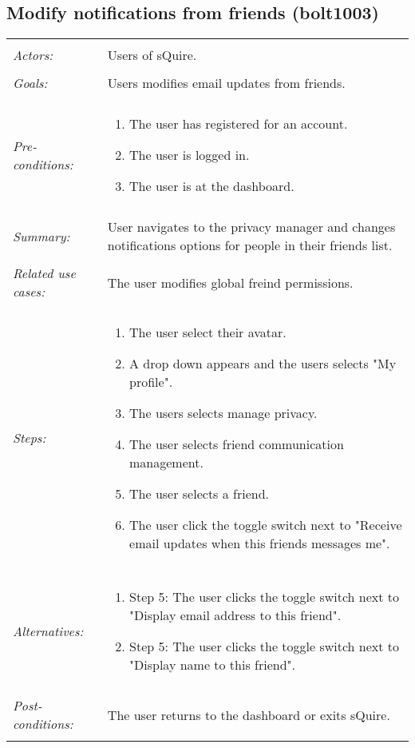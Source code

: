 \documentclass[11pt]{report}
\begin{document}
\subsection{Modify notifications from friends (bolt1003)}
\begin{tabular}{ p{2cm} p{12cm} }
 \hline
 \\
 \textit{Actors:} & Users of sQuire. \\ 
 \\
 \textit{Goals:} & Users modifies email updates from friends. \\
 \\
 \textit{Pre-conditions:} & \begin{enumerate}
  \item The user has registered for an account.
  \item The user is logged in.
  \item The user is at the dashboard.
 \end{enumerate} \\
 \\
 \textit{Summary:} & User navigates to the privacy manager and changes notifications options for people in their friends list.\\ 
 \\
 \textit{Related use cases:} & The user modifies global freind permissions. \\ 
 \\
 \textit{Steps:} & \begin{enumerate}
  \item The user select their avatar.
  \item A drop down appears and the users selects "My profile".
  \item The users selects manage privacy.
  \item The user selects friend communication management.
  \item The user selects a friend.
  \item The user click the toggle switch next to "Receive email updates when this friends messages me".
 \end{enumerate} \\
 \\
 \textit{Alternatives:} & \begin{enumerate} 
  \item Step 5: The user clicks the toggle switch next to "Display email address to this friend".
  \item Step 5: The user clicks the toggle switch next to "Display name to this friend".
 \end{enumerate} \\
 \\
 \textit{Post-conditions:} & The user returns to the dashboard or exits sQuire. \\
 \\
\hline
\end{tabular}
\end{document}
